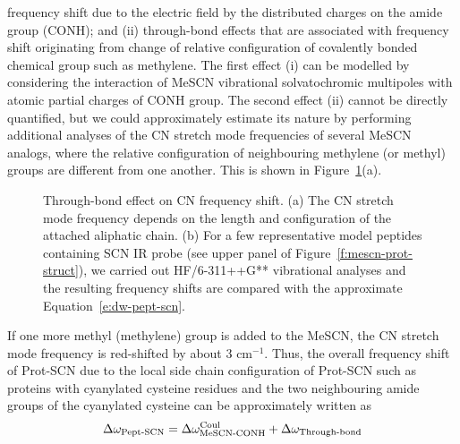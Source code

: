 \documentclass[a4paper,titlepage,twoside,fleqn,12pt]{book}
\begin{document}
\begin{refsection}
frequency shift due to the electric field by the distributed
charges on the amide group (CONH); and (ii) through\hyp{}bond
effects that are associated with frequency shift originating
from change of relative configuration of covalently bonded
chemical group such as methylene. The first effect (i) can be
modelled by considering the interaction of MeSCN
vibrational solvatochromic multipoles with atomic partial
charges of CONH group. The second effect (ii) cannot be
directly quantified, but we could approximately estimate its
nature by performing additional analyses of the CN stretch
mode frequencies of several MeSCN analogs,
where the relative configuration of neighbouring methylene (or
methyl) groups are different from one another. 
This is shown in Figure~\ref{f:mescn-prot-through-bond}(a). 
%
\begin{figure}[t!]
\centering
\setlength\fboxsep{0.4pt}
\setlength\fboxrule{0.5pt}
\caption{
Through-bond effect on CN frequency shift. (a) The CN stretch mode frequency depends on the length and
configuration of the attached aliphatic chain. (b) For a few representative model peptides containing SCN IR
probe (see upper panel of Figure~\ref{f:mescn-prot-struct}), 
we carried out HF/6-311++G** vibrational analyses and the resulting frequency shifts are
compared with the approximate Equation~\ref{e:dw-pept-scn}.
\label{f:mescn-prot-through-bond}}
\end{figure}
%
If one more
methyl (methylene) group is added to the MeSCN, the CN
stretch mode frequency is red\hyp{}shifted by about 3 cm$^{-1}$. Thus,
the overall frequency shift of Prot-SCN due to the local side chain
configuration of Prot-SCN such as proteins with
cyanylated cysteine residues and the two neighbouring amide
groups of the cyanylated cysteine can be approximately
written as
%
\begin{equation} \label{e:dw-pept-scn}
 \Delta\omega_{\text{Pept-SCN}} = \Delta\omega_{\text{MeSCN-CONH}}^{\rm Coul} + \Delta\omega_{\text{Through-bond}}

\end{equation}
\end{refsection}
\end{document}
